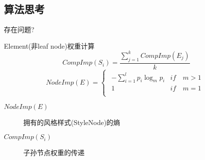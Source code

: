 \documentclass{beamer}
\begin{document}
\subsection{算法思考}
\begin{frame}{存在问题?}
    \begin{block}{Element(非leaf node)权重计算}
        {
        $$
        CompImp(S_i) = \frac{
                \sum_{j=1}^{k}{CompImp(E_j)}
            } {k}
        $$
        \pause
        $$
        NodeImp(E) = 
        \begin{cases}
            \begin{array}{ll}
                -\sum_{i=1}^{l}{p_i\log_{m}{p_i}} & if \quad m>1\\
                1                                   & if \quad m=1\\
            \end{array}    
        \end{cases}
        $$}
        \pause
        \begin{description}
        \item [$NodeImp(E)$] 拥有的风格样式(StyleNode)的熵
        \item [$CompImp(S_i)$] 子孙节点权重的传递
        \end{description}
    \end{block}
\end{frame}
\end{document}

